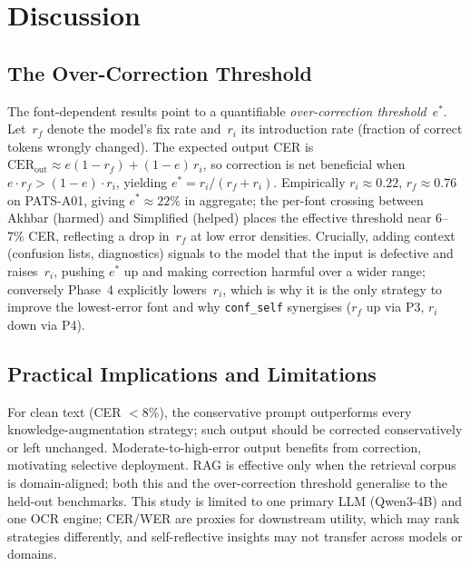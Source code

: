 \documentclass[conference]{IEEEtran}
\begin{document}
\section{Discussion}

\subsection{The Over-Correction Threshold}

The font-dependent results point to a quantifiable \textit{over-correction
threshold}~$e^*$. Let~$r_f$ denote the model's fix rate and~$r_i$ its
introduction rate (fraction of correct tokens wrongly changed). The expected
output CER is $\text{CER}_{\text{out}} \approx e(1 - r_f) + (1-e)\,r_i$, so
correction is net beneficial when $e \cdot r_f > (1-e) \cdot r_i$, yielding
$e^* = r_i / (r_f + r_i)$. Empirically $r_i \approx 0.22$, $r_f \approx 0.76$ on
PATS-A01, giving $e^*\approx22\%$ in aggregate; the per-font crossing between
Akhbar (harmed) and Simplified (helped) places the effective threshold near
6--7\% CER, reflecting a drop in~$r_f$ at low error densities. Crucially, adding
context (confusion lists, diagnostics) signals to the model that the input is
defective and raises~$r_i$, pushing $e^*$ up and making correction harmful over
a wider range; conversely Phase~4 explicitly lowers~$r_i$, which is why it is the
only strategy to improve the lowest-error font and why \texttt{conf\_self}
synergises ($r_f$ up via P3, $r_i$ down via P4).

\subsection{Practical Implications and Limitations}

For clean text (CER $<$8\%), the conservative prompt outperforms every
knowledge-augmentation strategy; such output should be corrected conservatively
or left unchanged. Moderate-to-high-error output benefits from correction,
motivating selective deployment. RAG is effective only when the retrieval corpus
is domain-aligned; both this and the over-correction threshold generalise to
the held-out benchmarks. This study is limited to one primary LLM (Qwen3-4B)
and one OCR engine; CER/WER are proxies for downstream utility, which may rank
strategies differently, and self-reflective insights may not transfer across
models or domains.

\end{document}
